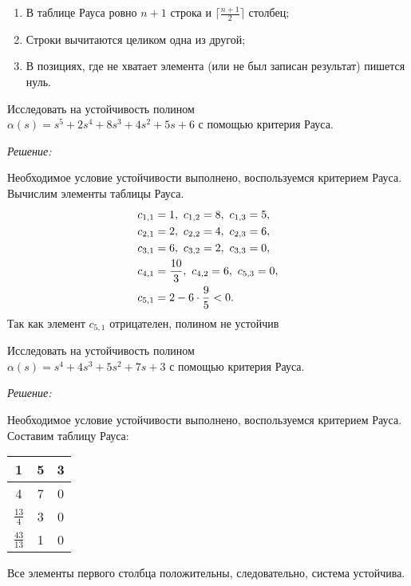 \documentclass[../../TAU.tex]{subfiles}
\begin{document}
    \begin{enumerate}
        \item В таблице Рауса ровно $n+1$ строка и 
        $\lceil\frac{n+1}{2}\rceil$ 
        столбец;
        \item Строки вычитаются целиком одна из другой;
        \item В позициях, где не хватает элемента  (или не был записан результат) пишется нуль.
    \end{enumerate}

    \examp Исследовать на устойчивость полином\\
    $\alpha(s) = s^5+2s^4+8s^3+4s^2+5s+6$ 
    с помощью критерия Рауса.

    {\it Решение:}\par
    Необходимое условие устойчивости выполнено, воспользуемся критерием Рауса. Вычислим элементы таблицы Рауса.
    \begin{align*}
        c_{1,1}& = 1,\ c_{1,2} = 8,\ c_{1,3} = 5, \\
        c_{2,1}& = 2,\ c_{2,2} = 4,\ c_{2,3} = 6, \\
        c_{3,1}& = 6,\ c_{3,2} = 2,\ c_{3,3} = 0, \\
        c_{4,1}& = {10\over3},\ c_{4,2} = 6,\ c_{5,3} = 0, \\
        c_{5,1}& = 2-6\cdot{9\over5} < 0.
    \end{align*}
    Так как элемент $c_{5,1}$ отрицателен, полином не устойчив 


    \examp Исследовать на устойчивость полином\\
    $\alpha(s) = s^4+4s^3+5s^2+7s+3$ 
    с помощью критерия Рауса.

    {\it Решение:}\par
    Необходимое условие устойчивости выполнено, воспользуемся критерием Рауса. Составим таблицу Рауса:
    \begin{center}
        \begin{tabular}[h]{|c|c|c|}
            \hline
            1 & 5 & 3 \\
            \hline
            4 & 7 & 0 \\
            \hline
            $\frac{13}{4}$ & 3 & 0 \\
            \hline
            $\frac{43}{13}$ & 1 & 0 \\
            \hline
        \end{tabular}
    \end{center}
    Все элементы первого столбца положительны, следовательно, система устойчива.
\end{document}
